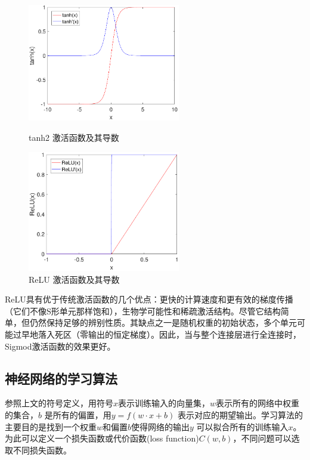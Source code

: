 \begin{figure}[hbt]
	\centering
	\begin{minipage}{7cm}
		\includegraphics[width=6.67cm]{figures/networks/tanh2}
    \caption{tanh2 激活函数及其导数}
    \label{fig:tanh2}

	\end{minipage}
	\hspace{10pt}
	\begin{minipage}{7cm}
		\includegraphics[width=6.67cm]{figures/networks/ReLU}
    \caption{ReLU 激活函数及其导数}
    \label{fig:ReLU}

	\end{minipage}

\end{figure}

ReLU具有优于传统激活函数的几个优点：更快的计算速度和更有效的梯度传播（它们不像S形单元那样饱和），生物学可能性和稀疏激活结构。尽管它结构简单，但仍然保持足够的辨别性质。其缺点之一是随机权重的初始状态，多个单元可能过早地落入死区（零输出的恒定梯度）。因此，当与整个连接层进行全连接时，Sigmod激活函数的效果更好。

\subsection{神经网络的学习算法}
参照上文的符号定义，用符号$x $表示训练输入的向量集，$w$表示所有的网络中权重的集合，$b$ 是所有的偏置，用$y=f(w\cdot x + b)$ 表示对应的期望输出。学习算法的主要目的是找到一个权重$w$和偏置$b$使得网络的输出$y$ 可以拟合所有的训练输入$x$。为此可以定义一个损失函数或代价函数(loss function)$C(w,b)$，不同问题可以选取不同损失函数。

